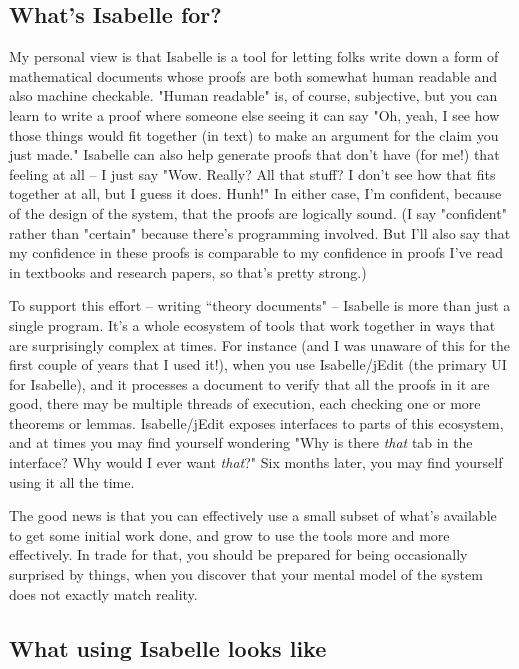 \subsection*{What's Isabelle for?}
My personal view is that Isabelle is a tool for letting folks write down 
a form of mathematical documents whose proofs are both somewhat human 
readable and also machine checkable. "Human readable" is, of course, subjective, but you can learn to write a proof where someone else seeing it can say "Oh, yeah, I see how those things would fit together (in text) to make an argument for the claim you just made." Isabelle can also help generate proofs that don't have (for me!) that feeling at all -- I just say "Wow. Really? All that stuff? I don't see how that fits together at all, but I guess it does. Hunh!"  In either case, I'm confident, because of the design of the system, that the proofs are logically sound. (I say "confident" rather than "certain" because there's programming involved. But I'll also say that my confidence in 
these proofs is comparable to my confidence in proofs I've read in textbooks and research papers, so that's pretty strong.)

To support this effort -- writing ``theory documents" -- Isabelle is more than just a single program. It's a whole ecosystem of tools that work together in ways that are surprisingly complex at times. For instance (and I was unaware of this for the first couple of years that I used it!), when you use Isabelle/jEdit (the primary UI for Isabelle), and it processes a document to verify that all the proofs in it are good, there may be multiple threads of execution, each checking one or more theorems or lemmas. Isabelle/jEdit exposes interfaces to parts of this ecosystem, and at times you may find yourself wondering "Why is there \textit{that} tab in the interface? Why would I ever want \textit{that}?" Six months later, you may find yourself using it all the time. 

The good news is that you can effectively use a small subset of what's available to get some initial work done, and grow to use the tools more and more effectively. In trade for that, you should be prepared for being occasionally surprised by things, when you discover that your mental model of the system does not exactly match reality. 

\subsection*{What using Isabelle looks like}

